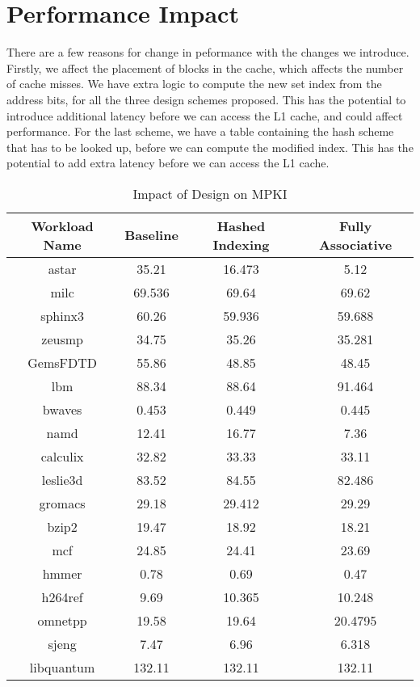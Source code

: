 \section{Performance Impact}
There are a few reasons for change in peformance with the changes we introduce. Firstly, we affect the placement of blocks in the cache, which affects the number of cache misses. We have extra logic to compute the new set index from the address bits, for all the three design schemes proposed. This has the potential to introduce additional latency before we can access the L1 cache, and could affect performance. For the last scheme, we have a table containing the hash scheme that has to be looked up, before we can compute the modified index. This has the potential to add extra latency before we can access the L1 cache.   

\begin{table}[h]
	\caption {Impact of Design on MPKI}
	\begin{tabular}{|c||c||c||c|}
	      \hline
	      Workload Name & Baseline & Hashed Indexing & Fully Associative\\
	      \hline
		astar & 35.21 & 16.473 & 5.12\\
	      \hline
		milc & 69.536 & 69.64 & 69.62\\
	      \hline
		sphinx3 & 60.26 & 59.936 & 59.688\\
	      \hline
		zeusmp & 34.75 & 35.26 & 35.281\\
	      \hline
		GemsFDTD & 55.86 & 48.85 & 48.45\\
	      \hline
		lbm & 88.34 & 88.64 & 91.464\\
	      \hline
		bwaves & 0.453 & 0.449 & 0.445\\
	      \hline 
		namd & 12.41 & 16.77 & 7.36\\
	      \hline
		calculix & 32.82 & 33.33 & 33.11\\
	      \hline
		leslie3d & 83.52 & 84.55 & 82.486\\
	      \hline
		gromacs & 29.18 & 29.412 & 29.29\\
	      \hline
		bzip2 & 19.47 & 18.92 & 18.21\\
	      \hline
		mcf & 24.85 & 24.41 & 23.69\\
	      \hline
		hmmer & 0.78 & 0.69 & 0.47\\
	      \hline
		h264ref & 9.69 & 10.365 & 10.248\\
	      \hline
		omnetpp & 19.58 & 19.64 & 20.4795\\
	      \hline 
		sjeng & 7.47 & 6.96 & 6.318\\
	      \hline
		libquantum & 132.11 & 132.11 & 132.11\\
	      \hline
	  \end{tabular}
\end{table}

